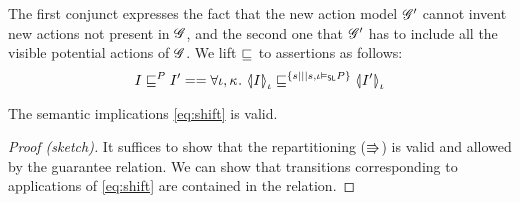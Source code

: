 The first conjunct expresses the fact that the new action model
$\gmod'$ cannot invent new actions not present in $\gmod$, and the
second one that $\gmod'$ has to include all the visible potential
actions of $\gmod$. We lift $\weakenI{}$ to assertions as follows:
\[
I \weakenI{P} I' == \V{\lenv,\ca{}} \semI[\lenv]{I} \weakenI{\{s|||
  s,\lenv\slsat P\}} \semI[\lenv]{I'}
\]




\begin{lemma}
  The semantic implications \eqref{eq:shift} is valid.
\end{lemma}
\begin{proof}[Proof (sketch)]
  It suffices to show that the repartitioning ($\semimplies$) is valid
  and allowed by the guarantee relation. We can show that transitions
  corresponding to applications of \eqref{eq:shift} are contained in
  the \shiftG relation.
\end{proof}

